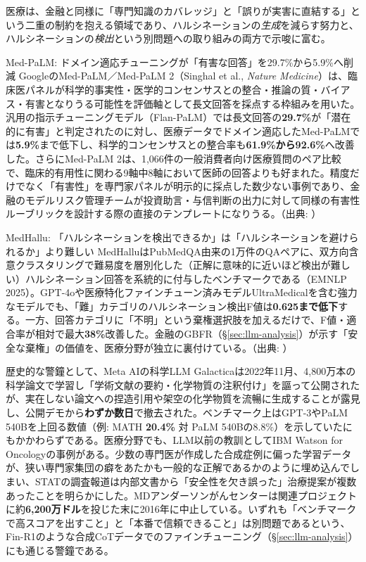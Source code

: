 医療は、金融と同様に「専門知識のカバレッジ」と「誤りが実害に直結する」という二重の制約を抱える領域であり、ハルシネーションの\emph{生成}を減らす努力と、ハルシネーションの\emph{検出}という別問題への取り組みの両方で示唆に富む。

\begin{casestudy}{Med-PaLM: ドメイン適応チューニングが「有害な回答」を29.7\%から5.9\%へ削減}
GoogleのMed-PaLM／Med-PaLM 2（Singhal et al., \emph{Nature Medicine}）は、臨床医パネルが科学的事実性・医学的コンセンサスとの整合・推論の質・バイアス・有害となりうる可能性を評価軸として長文回答を採点する枠組みを用いた。汎用の指示チューニングモデル（Flan-PaLM）では長文回答の\textbf{29.7\%}が「潜在的に有害」と判定されたのに対し、医療データでドメイン適応したMed-PaLMでは\textbf{5.9\%}まで低下し、科学的コンセンサスとの整合率も\textbf{61.9\%から92.6\%}へ改善した。さらにMed-PaLM 2は、1,066件の一般消費者向け医療質問のペア比較で、臨床的有用性に関わる9軸中8軸において医師の回答よりも好まれた。精度だけでなく「有害性」を専門家パネルが明示的に採点した数少ない事例であり、金融のモデルリスク管理チームが投資助言・与信判断の出力に対して同様の有害性ルーブリックを設計する際の直接のテンプレートになりうる。（出典: \cite{y05medpalm2_2025}）
\end{casestudy}

\begin{casestudy}{MedHallu: 「ハルシネーションを検出できるか」は「ハルシネーションを避けられるか」より難しい}
MedHalluはPubMedQA由来の1万件のQAペアに、双方向含意クラスタリングで難易度を層別化した（正解に意味的に近いほど検出が難しい）ハルシネーション回答を系統的に付与したベンチマークである（EMNLP 2025）。GPT-4oや医療特化ファインチューン済みモデルUltraMedicalを含む強力なモデルでも、「難」カテゴリのハルシネーション検出F値は\textbf{0.625まで低下}する。一方、回答カテゴリに「不明」という棄権選択肢を加えるだけで、F値・適合率が相対で最大\textbf{38\%}改善した。金融のGBFR（\S\ref{sec:llm-analysis}）が示す「安全な棄権」の価値を、医療分野が独立に裏付けている。（出典: \cite{y05medhallu2025}）
\end{casestudy}

歴史的な警鐘として、Meta AIの科学LLM Galacticaは2022年11月、4,800万本の科学論文で学習し「学術文献の要約・化学物質の注釈付け」を謳って公開されたが、実在しない論文への捏造引用や架空の化学物質を流暢に生成することが露見し、公開デモから\textbf{わずか数日}で撤去された。ベンチマーク上はGPT-3やPaLM 540Bを上回る数値（例: MATH \textbf{20.4\%} 対 PaLM 540Bの8.8\%）を示していたにもかかわらずである\cite{y05galactica2022}。医療分野でも、LLM以前の教訓としてIBM Watson for Oncologyの事例がある。少数の専門医が作成した合成症例に偏った学習データが、狭い専門家集団の癖をあたかも一般的な正解であるかのように埋め込んでしまい、STATの調査報道は内部文書から「安全性を欠き誤った」治療提案が複数あったことを明らかにした。MDアンダーソンがんセンターは関連プロジェクトに約\textbf{6,200万ドル}を投じた末に2016年に中止している\cite{y05watsononcology2018}。いずれも「ベンチマークで高スコアを出すこと」と「本番で信頼できること」は別問題であるという、Fin-R1のような合成CoTデータでのファインチューニング（\S\ref{sec:llm-analysis}）にも通じる警鐘である。

